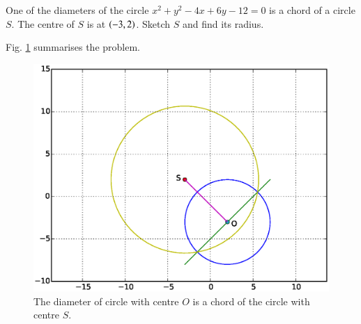 \documentclass[journal,12pt,twocolumn]{IEEEtran}
\begin{document}
%
\begin{problem}
One of the diameters of the  circle $x^2+y^2-4x+6y-12 = 0$ is a chord of a circle $S$. The centre of $S$ is at $\left(-3,2\right)$. Sketch $S$ and find its radius.
\end{problem}
\solution

Fig. \ref{fig_36} summarises the problem.

%
\begin{figure}[h]
\centering
\includegraphics[width=\columnwidth]{./figs/ee16b1036}
\caption{ The diameter of circle with centre $O$ is a chord of the circle with centre $S$.}
\label{fig_36}	
\end{figure}
%
\end{document}
